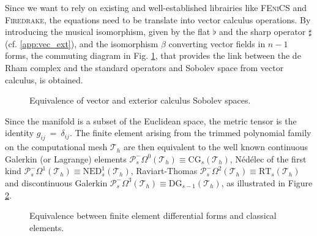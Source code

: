 \documentclass{elsarticle}
\renewcommand\d{\ensuremath{\mathrm{d}}}
\DeclareMathOperator*{\grad}{grad}
\renewcommand{\div}{\operatorname{div}}
\DeclareMathOperator*{\curl}{curl}
\newcommand{\fenics}{\textsc{FEniCS}\xspace}
\newcommand{\firedrake}{\textsc{Firedrake}\xspace}
\begin{document}
Since we want to rely on existing and well-established librairies like \fenics and \firedrake, the equations need to be translate into vector calculus operations. By introducing the musical isomorphism, given by the flat $\flat$ and the sharp operator $\sharp$ (cf. \ref{app:vec_ext}), and the isomorphism $\beta$ converting vector fields in $n-1$ forms, the commuting diagram in Fig. \ref{fig:cd_ext_vec}, that provides the link between the de Rham complex and the standard operators and Sobolev space from vector calculus, is obtained.
\begin{figure}[h]
\centering
{}  
\caption{Equivalence of vector and exterior calculus Sobolev spaces.}
\label{fig:cd_ext_vec}
\end{figure}

Since the manifold is a subset of the Euclidean space, the metric tensor is the identity $g_{ij}~=~\delta_{ij}$. The finite element arising from the trimmed polynomial family on the computational mesh $\mathcal{T}_h$ are then equivalent to the well known continuous Galerkin (or Lagrange) elements $\mathcal{P}^-_s\Omega^0(\mathcal{T}_h) \equiv \mathrm{CG}_s(\mathcal{T}_h)$, Nédélec of the first kind $\mathcal{P}^-_s\Omega^1(\mathcal{T}_h) \equiv \mathrm{NED}_s^1(\mathcal{T}_h)$, Raviart-Thomas $\mathcal{P}^-_s\Omega^2(\mathcal{T}_h) \equiv \mathrm{RT}_s(\mathcal{T}_h)$ and discontinuous Galerkin $\mathcal{P}^-_s\Omega^3(\mathcal{T}_h) \equiv \mathrm{DG}_{s-1}(\mathcal{T}_h)$, as illustrated in  Figure \ref{fig:fe_ext_vec}.

\begin{figure}[h]
\centering
{}  
\caption{Equivalence between finite element differential forms and classical elements.}
\label{fig:fe_ext_vec}
\end{figure}
\end{document}

